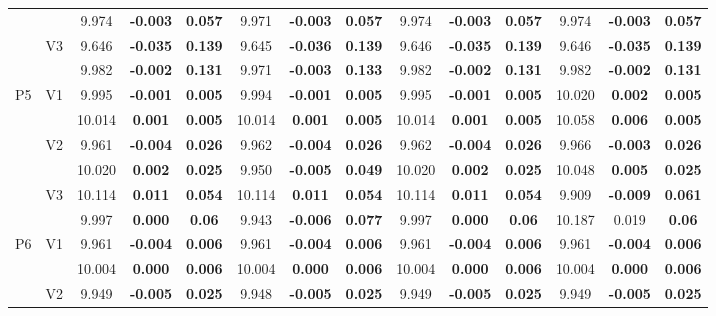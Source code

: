 \documentclass[11pt,a4paper]{article}
\begin{document}
{\begin{sidewaystable}[H]
{\begin{tabular}{cc|ccc|ccc|ccc|ccc|}
   &  & 9.974 & \textbf{-0.003} & \textbf{0.057} & 9.971 & \textbf{-0.003} & \textbf{0.057} & 9.974 & \textbf{-0.003} & \textbf{0.057} & 9.974 & \textbf{-0.003} & \textbf{0.057} \\ 
   & \multirow{2}{*}{V3} & 9.646 & \textbf{-0.035} & \textbf{0.139} & 9.645 & \textbf{-0.036} & \textbf{0.139} & 9.646 & \textbf{-0.035} & \textbf{0.139} & 9.646 & \textbf{-0.035} & \textbf{0.139} \\ 
   &  & 9.982 & \textbf{-0.002} & \textbf{0.131} & 9.971 & \textbf{-0.003} & \textbf{0.133} & 9.982 & \textbf{-0.002} & \textbf{0.131} & 9.982 & \textbf{-0.002} & \textbf{0.131} \\ 
   \hline \hline\multirow{6}{*}{P5} & \multirow{2}{*}{V1} & 9.995 & \textbf{-0.001} & \textbf{0.005} & 9.994 & \textbf{-0.001} & \textbf{0.005} & 9.995 & \textbf{-0.001} & \textbf{0.005} & 10.020 & \textbf{0.002} & \textbf{0.005} \\ 
   &  & 10.014 & \textbf{0.001} & \textbf{0.005} & 10.014 & \textbf{0.001} & \textbf{0.005} & 10.014 & \textbf{0.001} & \textbf{0.005} & 10.058 & \textbf{0.006} & \textbf{0.005} \\ 
   & \multirow{2}{*}{V2} & 9.961 & \textbf{-0.004} & \textbf{0.026} & 9.962 & \textbf{-0.004} & \textbf{0.026} & 9.962 & \textbf{-0.004} & \textbf{0.026} & 9.966 & \textbf{-0.003} & \textbf{0.026} \\ 
   &  & 10.020 & \textbf{0.002} & \textbf{0.025} & 9.950 & \textbf{-0.005} & \textbf{0.049} & 10.020 & \textbf{0.002} & \textbf{0.025} & 10.048 & \textbf{0.005} & \textbf{0.025} \\ 
   & \multirow{2}{*}{V3} & 10.114 & \textbf{0.011} & \textbf{0.054} & 10.114 & \textbf{0.011} & \textbf{0.054} & 10.114 & \textbf{0.011} & \textbf{0.054} & 9.909 & \textbf{-0.009} & \textbf{0.061} \\ 
   &  & 9.997 & \textbf{0.000} & \textbf{0.06} & 9.943 & \textbf{-0.006} & \textbf{0.077} & 9.997 & \textbf{0.000} & \textbf{0.06} & 10.187 & 0.019 & \textbf{0.06} \\ 
   \hline \hline\multirow{6}{*}{P6} & \multirow{2}{*}{V1} & 9.961 & \textbf{-0.004} & \textbf{0.006} & 9.961 & \textbf{-0.004} & \textbf{0.006} & 9.961 & \textbf{-0.004} & \textbf{0.006} & 9.961 & \textbf{-0.004} & \textbf{0.006} \\ 
   &  & 10.004 & \textbf{0.000} & \textbf{0.006} & 10.004 & \textbf{0.000} & \textbf{0.006} & 10.004 & \textbf{0.000} & \textbf{0.006} & 10.004 & \textbf{0.000} & \textbf{0.006} \\ 
   & \multirow{2}{*}{V2} & 9.949 & \textbf{-0.005} & \textbf{0.025} & 9.948 & \textbf{-0.005} & \textbf{0.025} & 9.949 & \textbf{-0.005} & \textbf{0.025} & 9.949 & \textbf{-0.005} & \textbf{0.025} \\ 

\end{tabular}}
\end{sidewaystable}}
\end{document}
